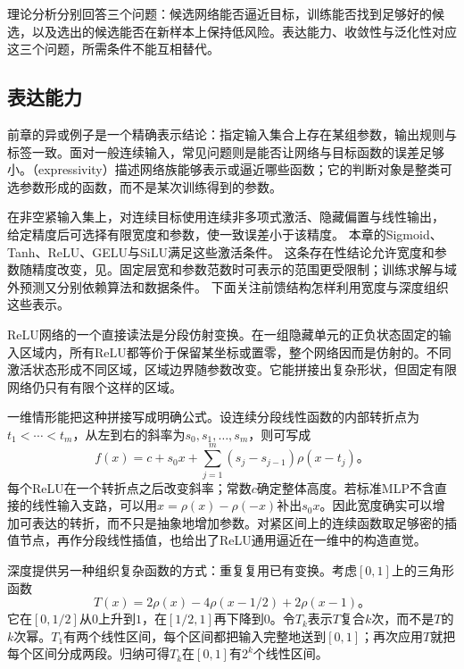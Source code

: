 理论分析分别回答三个问题：候选网络能否逼近目标，训练能否找到足够好的候选，以及选出的候选能否在新样本上保持低风险。表达能力、收敛性与泛化性对应这三个问题，所需条件不能互相替代。

\subsection{表达能力}
\label{sec:ffn-expressivity}

前章的异或例子是一个精确表示结论：指定输入集合上存在某组参数，输出规则与标签一致。面对一般连续输入，常见问题则是能否让网络与目标函数的误差足够小。（expressivity）描述网络族能够表示或逼近哪些函数；它的判断对象是整类可选参数形成的函数，而不是某次训练得到的参数。

在非空紧输入集上，对连续目标使用连续非多项式激活、隐藏偏置与线性输出，
给定精度后可选择有限宽度和参数，使一致误差小于该精度。
本章的Sigmoid、Tanh、ReLU、GELU与SiLU满足这些激活条件。
这条存在性结论允许宽度和参数随精度改变，见。固定层宽和参数范数时可表示的范围更受限制；训练求解与域外预测又分别依赖算法和数据条件。
下面关注前馈结构怎样利用宽度与深度组织这些表示。

ReLU网络的一个直接读法是分段仿射变换。在一组隐藏单元的正负状态固定的输入区域内，所有ReLU都等价于保留某坐标或置零，整个网络因而是仿射的。不同激活状态形成不同区域，区域边界随参数改变。它能拼接出复杂形状，但固定有限网络仍只有有限个这样的区域。

一维情形能把这种拼接写成明确公式。设连续分段线性函数的内部转折点为$t_1<\cdots<t_m$，从左到右的斜率为$s_0,s_1,\ldots,s_m$，则可写成
\begin{equation}
  f(x)=c+s_0x+
  \sum_{j=1}^{m}(s_j-s_{j-1})\rho(x-t_j)\text{。}
  \label{eq:ffn-piecewise-linear-representation}
\end{equation}
每个ReLU在一个转折点之后改变斜率；常数$c$确定整体高度。若标准MLP不含直接的线性输入支路，可以用$x=\rho(x)-\rho(-x)$补出$s_0x$。因此宽度确实可以增加可表达的转折，而不只是抽象地增加参数。对紧区间上的连续函数取足够密的插值节点，再作分段线性插值，也给出了ReLU通用逼近在一维中的构造直觉。

深度提供另一种组织复杂函数的方式：重复复用已有变换。考虑$[0,1]$上的三角形函数
\begin{equation}
  T(x)=2\rho(x)-4\rho(x-1/2)+2\rho(x-1)\text{。}
  \label{eq:ffn-tent-function}
\end{equation}
它在$[0,1/2]$从$0$上升到$1$，在$[1/2,1]$再下降到$0$。令$T_k$表示$T$复合$k$次，而不是$T$的$k$次幂。$T_1$有两个线性区间，每个区间都把输入完整地送到$[0,1]$；再次应用$T$就把每个区间分成两段。归纳可得$T_k$在$[0,1]$有$2^k$个线性区间。

